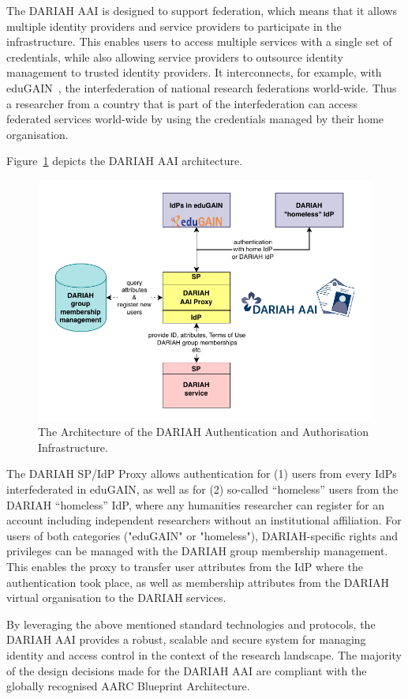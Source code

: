 \documentclass[final]{anthology-ch} %
\begin{document}
The DARIAH AAI is designed to support federation, which means that it allows multiple identity providers and service providers to participate in the infrastructure. This enables users to access multiple services with a single set of credentials, while also allowing service providers to outsource identity management to trusted identity providers. It interconnects, for example, with eduGAIN~\cite{web_eduGAIN}, the interfederation of national research federations world-wide. Thus a researcher from a country that is part of the interfederation can access federated services world-wide by using the credentials managed by their home organisation.

Figure~\ref{fig:dariahaai1} depicts the DARIAH AAI architecture.
%
\begin{figure}[t!]
  \centering
  \includegraphics[width=0.7\linewidth]{figures/Figure_dariahaai1-v2.pdf}
  \caption{The Architecture of the DARIAH Authentication and Authorisation Infrastructure.}
  \label{fig:dariahaai1}
\end{figure}
%
The DARIAH SP/IdP Proxy allows authentication for (1) users from every IdPs interfederated in eduGAIN, as well as for (2) so-called “homeless” users from the DARIAH “homeless” IdP, where any humanities researcher can register for an account including independent researchers without an institutional affiliation. 
For users of both categories ("eduGAIN" or "homeless"), DARIAH-specific rights and privileges can be managed with the DARIAH group membership management. This enables the proxy to transfer user attributes from the IdP where the authentication took place, as well as membership attributes from the DARIAH virtual organisation to the DARIAH services.

By leveraging the above mentioned standard technologies and protocols, the DARIAH AAI provides a robust, scalable and secure system for managing identity and access control in the context of the research landscape. The majority of the design decisions made for the DARIAH AAI are compliant with the globally recognised AARC Blueprint Architecture.
\end{document}
